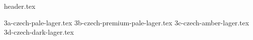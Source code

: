 \clearpage
{}
\divisorLine
{header.tex}
\begin{multicols}{2}
{3a-czech-pale-lager.tex}
{3b-czech-premium-pale-lager.tex}
{3c-czech-amber-lager.tex}
{3d-czech-dark-lager.tex}
\end{multicols}